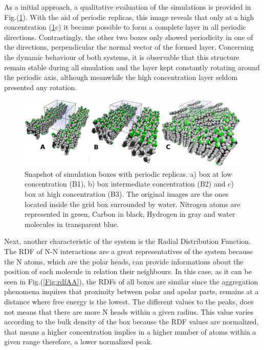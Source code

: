 \documentclass[10pt,a4paper,twoside]{article}
\begin{document}
As a initial approach, a qualitative evaluation of the simulations is provided in Fig.(\ref{Fig:aabox}). With the aid of periodic replicas, this image reveals that only at a high concentration (\ref{Fig:aabox}c) it became possible to form a complete layer in all periodic directions. Contrastingly, the other two boxes only showed periodicity in one of the directions, perpendicular the normal vector of the formed layer. Concerning the dynamic behaviour of both systems, it is observable that this structure remain stable during all simulation and the layer kept constantly rotating around the periodic axis, although meanwhile the high concentration layer seldom presented any rotation.   
\begin{figure}[ht!]
  \begin{center}
	\includegraphics[width=1 \textwidth]{./images/AAPBC}
	\caption{Snapshot of simulation boxes with periodic replicas. a) box at low concentration (B1), b) box intermediate concentration (B2) and c) box at high concentration (B3). The original images are the ones located inside the grid box surrounded by water. Nitrogen atoms are represented in green, Carbon in black, Hydrogen in gray and water molecules in transparent blue. }
	\label{Fig:aabox}
  \end{center}
\end{figure}

Next, another characteristic of the system is the Radial Distribution Function. The RDF of N-N interactions are a great representatives of the system because the N atoms, which are the polar heads, can provide informations about the position of each molecule in relation their neighbours. In this case, as it can be seen in Fig.(\ref{Fig:rdfAA}), the RDFs of all boxes are similar since the aggregation phenomena inquires that proximity between polar and apolar parts, remains at a distance where free energy is the lowest. The different values to the peaks, does not means that there are more N heads within a given radius. This value varies according to the bulk density of the box because the RDF values are normalized, that means a higher concentration implies in a higher number of atoms within a given range  therefore, a lower normalized peak.  
\end{document}
